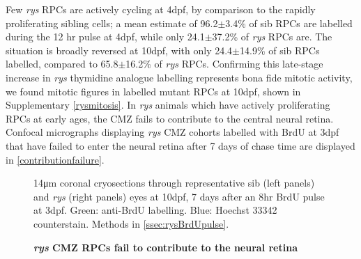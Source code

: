 \documentclass{ut-thesis}
\begin{document}
\begin{NoHyper}
Few \textit{rys} RPCs are actively cycling at 4dpf, by comparison to the rapidly proliferating sibling cells; a mean estimate of 96.2$\pm$3.4\% of sib RPCs are labelled during the 12 hr pulse at 4dpf, while only 24.1$\pm$37.2\% of \textit{rys} RPCs are. The situation is broadly reversed at 10dpf, with only 24.4$\pm$14.9\% of sib RPCs labelled, compared to 65.8$\pm$16.2\% of \textit{rys} RPCs. Confirming this late-stage increase in \textit{rys} thymidine analogue labelling represents bona fide mitotic activity, we found mitotic figures in labelled mutant RPCs at 10dpf, shown in Supplementary \autoref{rysmitosis}. In \textit{rys} animals which have actively proliferating RPCs at early ages, the CMZ fails to contribute to the central neural retina. Confocal micrographs displaying \textit{rys} CMZ cohorts labelled with BrdU at 3dpf that have failed to enter the neural retina after 7 days of chase time are displayed in \autoref{contributionfailure}. 

\begin{figure}[!h]
    \caption{{\bf \textit{rys} CMZ RPCs fail to contribute to the neural retina}}
    14\si{\micro\metre} coronal cryosections through representative sib (left panels) and \textit{rys} (right panels) eyes at 10dpf, 7 days after an 8hr BrdU pulse at 3dpf. Green: anti-BrdU labelling. Blue: Hoechst 33342 counterstain.
    Methods in \autoref{ssec:rysBrdUpulse}.
    \label{contributionfailure}
\end{figure}
\FloatBarrier


\end{NoHyper}
\end{document}
